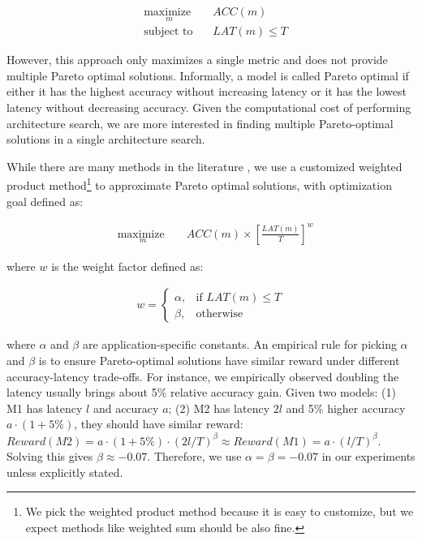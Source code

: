 \documentclass[10pt,twocolumn,letterpaper]{article}
\begin{document}
\begin{equation} \label{eq:opthard}
\begin{aligned}
& \underset{m}{\text{maximize }} & & ACC(m) \\
& \text{subject to} & & LAT(m) \le T
\end{aligned}
\end{equation} 

\noindent However, this approach only maximizes a single metric and does not provide multiple Pareto optimal solutions. Informally, a model is called Pareto optimal \cite{multiobjbook14} if either it has the highest accuracy without increasing latency or it has the lowest latency without decreasing accuracy. Given the computational cost of performing architecture search, we are more interested in finding multiple Pareto-optimal solutions in a single architecture search.


While there are many methods in the literature \cite{multiobjbook14}, we use a customized weighted product method\footnote{We pick the weighted product method because it is easy to customize, but we expect methods like weighted sum should be also fine.} to approximate Pareto optimal solutions, with  optimization goal defined as:

\begin{equation} \label{eq:reward}
	\begin{aligned}
	& \underset{m}{\text{maximize  }} & & {ACC(m)} \times \left[ \frac{ LAT(m)}{T} \right] ^ w
	\end{aligned}
\end{equation} 


\noindent where $w$ is the weight factor defined as:

\begin{equation} \label{eq:alpha}
\begin{aligned}
w = 
\begin{cases}
\alpha,               & \text{if } LAT(m) \leq T\\
\beta,                & \text{otherwise}
\end{cases}
\end{aligned}
\end{equation} 

\noindent where $\alpha$ and $\beta$ are application-specific constants. An empirical rule for picking $\alpha$ and $\beta$ is to
ensure Pareto-optimal solutions have similar reward under different accuracy-latency trade-offs. For instance, we empirically observed doubling the latency usually brings about 5\% relative accuracy gain. Given two models: (1) M1 has latency $l$ and accuracy $a$; (2) M2 has latency $2l$ and 5\% higher accuracy $ a \cdot (1 + 5\%)$, they should have similar reward: $Reward(M2) = a \cdot (1+ 5\%) \cdot (2l / T)^\beta \approx Reward(M1) = a \cdot (l / T)^\beta$. Solving this gives $\beta \approx -0.07$. Therefore, we use $\alpha=\beta=-0.07$ in our experiments unless explicitly stated.
\end{document}
